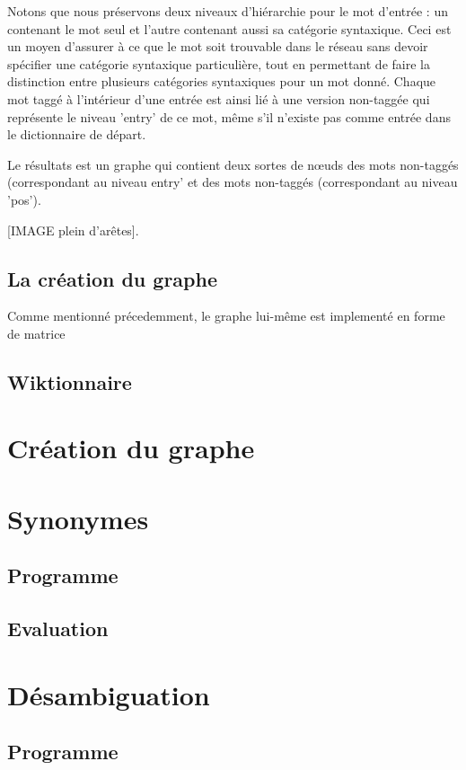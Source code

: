 \documentclass[a4paper, 12pt]{article}
\begin{document}
Notons que nous préservons deux niveaux d'hiérarchie pour le mot d'entrée : un contenant le mot seul et l'autre contenant aussi sa catégorie syntaxique. Ceci est un moyen d'assurer à ce que le mot soit trouvable dans le réseau sans devoir spécifier une catégorie syntaxique particulière, tout en permettant de faire la distinction entre plusieurs catégories syntaxiques pour un mot donné. Chaque mot taggé à l'intérieur d'une entrée est ainsi lié à une version non-taggée qui représente le niveau 'entry' de ce mot, même s'il n'existe pas comme entrée dans le dictionnaire de départ.

Le résultats est un graphe qui contient deux sortes de nœuds des mots non-taggés (correspondant au niveau entry' et des mots non-taggés (correspondant au niveau 'pos').

[IMAGE plein d'arêtes].

\subsection{La création du graphe}
Comme mentionné précedemment, le graphe lui-même est implementé en forme de matrice

\subsection{Wiktionnaire}


\section{Création du graphe}


\section{Synonymes}
\subsection{Programme}

\subsection{Evaluation}

\section{Désambiguation}
\subsection{Programme}
\end{document}
